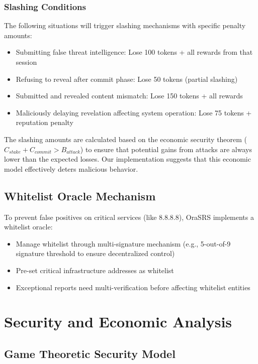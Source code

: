 \documentclass[12pt]{article}
\begin{document}
\subsubsection{Slashing Conditions}
The following situations will trigger slashing mechanisms with specific penalty amounts:
\begin{itemize}
\item Submitting false threat intelligence: Lose 100 tokens + all rewards from that session
\item Refusing to reveal after commit phase: Lose 50 tokens (partial slashing)
\item Submitted and revealed content mismatch: Lose 150 tokens + all rewards
\item Maliciously delaying revelation affecting system operation: Lose 75 tokens + reputation penalty
\end{itemize}

The slashing amounts are calculated based on the economic security theorem ($C_{stake} + C_{commit} > B_{attack}$) to ensure that potential gains from attacks are always lower than the expected losses. Our implementation suggests that this economic model effectively deters malicious behavior.

\subsection{Whitelist Oracle Mechanism}

To prevent false positives on critical services (like 8.8.8.8), OraSRS implements a whitelist oracle:

\begin{itemize}
\item Manage whitelist through multi-signature mechanism (e.g., 5-out-of-9 signature threshold to ensure decentralized control)
\item Pre-set critical infrastructure addresses as whitelist
\item Exceptional reports need multi-verification before affecting whitelist entities
\end{itemize}

\section{Security and Economic Analysis}

\subsection{Game Theoretic Security Model}
\end{document}
